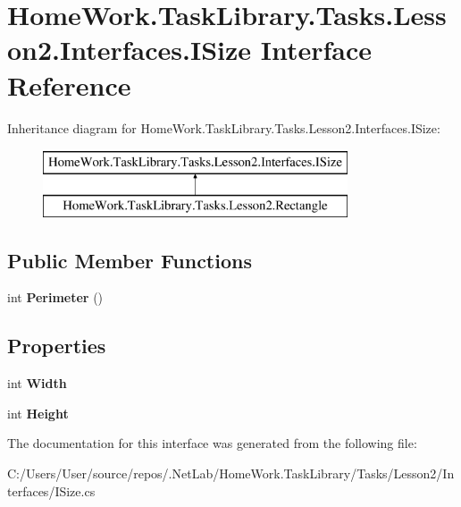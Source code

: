 \hypertarget{interface_home_work_1_1_task_library_1_1_tasks_1_1_lesson2_1_1_interfaces_1_1_i_size}{}\section{Home\+Work.\+Task\+Library.\+Tasks.\+Lesson2.\+Interfaces.\+I\+Size Interface Reference}
\label{interface_home_work_1_1_task_library_1_1_tasks_1_1_lesson2_1_1_interfaces_1_1_i_size}
Inheritance diagram for Home\+Work.\+Task\+Library.\+Tasks.\+Lesson2.\+Interfaces.\+I\+Size\+:\begin{figure}[H]
\begin{center}
\leavevmode
\includegraphics[height=2.000000cm]{interface_home_work_1_1_task_library_1_1_tasks_1_1_lesson2_1_1_interfaces_1_1_i_size}
\end{center}
\end{figure}
\subsection*{Public Member Functions}
\begin{DoxyCompactItemize}
\item 
\mbox{\label{interface_home_work_1_1_task_library_1_1_tasks_1_1_lesson2_1_1_interfaces_1_1_i_size_a87b1fac70a7e2cac39be0c6cef50394e}} 
int {\bfseries Perimeter} ()
\end{DoxyCompactItemize}
\subsection*{Properties}
\begin{DoxyCompactItemize}
\item 
\mbox{\label{interface_home_work_1_1_task_library_1_1_tasks_1_1_lesson2_1_1_interfaces_1_1_i_size_a44cbdadb057d446445550dfe9adcf642}} 
int {\bfseries Width}
\item 
\mbox{\label{interface_home_work_1_1_task_library_1_1_tasks_1_1_lesson2_1_1_interfaces_1_1_i_size_a4fb9f25b1af3fd9a6665bf129ad1dc19}} 
int {\bfseries Height}
\end{DoxyCompactItemize}


The documentation for this interface was generated from the following file\+:\begin{DoxyCompactItemize}
\item 
C\+:/\+Users/\+User/source/repos/.\+Net\+Lab/\+Home\+Work.\+Task\+Library/\+Tasks/\+Lesson2/\+Interfaces/I\+Size.\+cs\end{DoxyCompactItemize}
